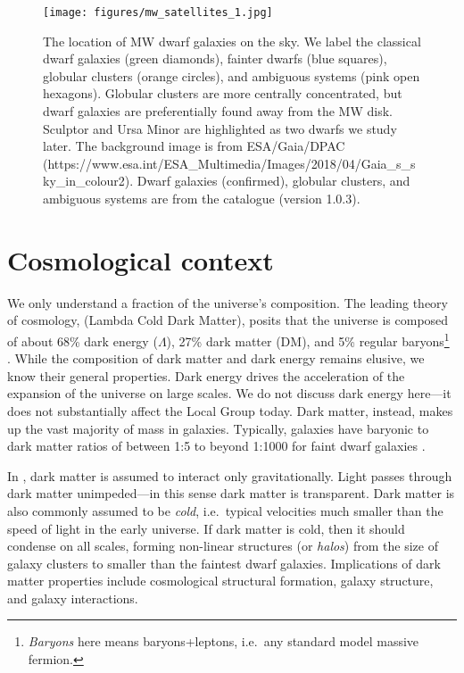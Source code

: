 \begin{figure}
\centering
\texttt{[image: figures/mw\_satellites\_1.jpg]}
\caption[Dwarf galaxies sky position]{The location of MW dwarf galaxies
on the sky. We label the classical dwarf galaxies (green diamonds),
fainter dwarfs (blue squares), globular clusters (orange circles), and
ambiguous systems (pink open hexagons). Globular clusters are more
centrally concentrated, but dwarf galaxies are preferentially found away
from the MW disk. Sculptor and Ursa Minor are highlighted as two dwarfs
we study later. The background image is from ESA/Gaia/DPAC
(https://www.esa.int/ESA\_Multimedia/Images/2018/04/Gaia\_s\_sky\_in\_colour2).
Dwarf galaxies (confirmed), globular clusters, and ambiguous systems are
from the \citet{pace2024} catalogue (version
1.0.3).}\label{fig:mw_satellite_system}
\end{figure}

\section{Cosmological context}\label{cosmological-context}

We only understand a fraction of the universe's composition. The leading
theory of cosmology, \LCDM{} (Lambda Cold Dark Matter), posits that the
universe is composed of about 68\% dark energy (\(\Lambda\)), 27\% dark
matter (DM), and 5\% regular baryons\footnote{\emph{Baryons} here means
  baryons+leptons, i.e.~any standard model massive fermion.}
\citep{planckcollaboration+2020}. While the composition of dark matter
and dark energy remains elusive, we know their general properties. Dark
energy drives the acceleration of the expansion of the universe on large
scales. We do not discuss dark energy here---it does not substantially
affect the Local Group today. Dark matter, instead, makes up the vast
majority of mass in galaxies. Typically, galaxies have baryonic to dark
matter ratios of between 1:5 to beyond 1:1000 for faint dwarf galaxies
\citep[e.g.,][]{hayashi+2023}.

In \LCDM{}, dark matter is assumed to interact only gravitationally.
Light passes through dark matter unimpeded---in this sense dark matter
is transparent. Dark matter is also commonly assumed to be \emph{cold},
i.e.~typical velocities much smaller than the speed of light in the
early universe. If dark matter is cold, then it should condense on all
scales, forming non-linear structures (or \emph{halos}) from the size of
galaxy clusters to smaller than the faintest dwarf galaxies.
Implications of dark matter properties include cosmological structural
formation, galaxy structure, and galaxy interactions.

